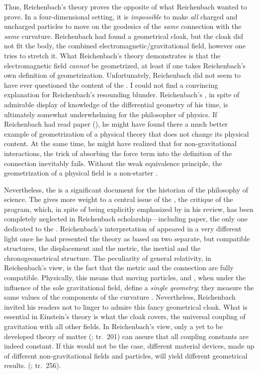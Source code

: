 \documentclass[submitted]{article}
\newcommand{\PRZL}{\citetitle{Reichenbach1928}\xspace}
\renewcommand{\rzlp}[2]{(\cite[#1]{Reichenbach1928}; tr.\ #2)\xspace}
\begin{document}
Thus, Reichenbach's theory proves the opposite of what Reichenbach wanted to prove. In a four-dimensional setting, it is \emph{impossible} to make \emph{all} charged and uncharged particles to move on the geodesics of the \emph{same} connection with the \emph{same} curvature. Reichenbach had found a geometrical cloak, but the cloak did not fit the body, the combined electromagnetic/gravitational field, however one tries to stretch it. What Reichenbach's theory demonstrates is that the electromagnetic field \emph{cannot} be geometrized, at least if one takes Reichenbach's own definition of geometrization. Unfortunately, Reichenbach did not seem to have ever questioned the content of the \Ap \citep{Einstein1928a,Einstein1929b}. I could not find a convincing explanation for Reichenbach's resounding blunder. Reichenbach's \Ap, in spite of admirable display of knowledge of the differential geometry of his time, is ultimately somewhat underwhelming for the philosopher of physics. If Reichenbach had read  paper (), he might have found there a much better example of geometrization of a physical theory that does not change its physical content. At the same time, he might have realized that for non-gravitational interactions, the trick of absorbing the force term into the definition of the connection inevitably fails. Without the weak equivalence principle, the geometrization of a physical field is a non-starter \citep[cf., however,]{Droz-Vincent1967}.

Nevertheless, the \Ap is a significant document for the historian of the philosophy of science. The \Ap gives more weight to a central issue of the \PRZL, the critique of the  program, which, in spite of being explicitly emphasized by \citet{Einstein1928d} in his review, has been completely neglected in Reichenbach scholarship---including  paper, the only one dedicated to the \Ap. Reichenbach's interpretation of \gr appeared in a very different light once he had presented the theory as based on two separate, but compatible structures, the displacement and the metric, the inertial and the chronogeometrical structure. The peculiarity of general relativity, in Reichenbach's view, is the fact that the metric and the connection are fully compatible. Physically, this means that moving particles, and \rac, when under the influence of the sole gravitational field, define a \emph{single geometry}; they measure the same values of the components of the curvature \rite. Nevertheless, Reichenbach invited his readers not to linger to admire this fancy geometrical cloak. What is essential in Einstein's theory is what the cloak covers, the universal coupling of gravitation with all other fields. In Reichenbach's view, only a yet to be developed theory of matter \rzlp{233}{201} can assure that all coupling constants are indeed constant. If this would not be the case, different material devices, made up of different non-gravitational fields and particles, will yield different geometrical results.  \rzlp{295}{256}.
\end{document}
